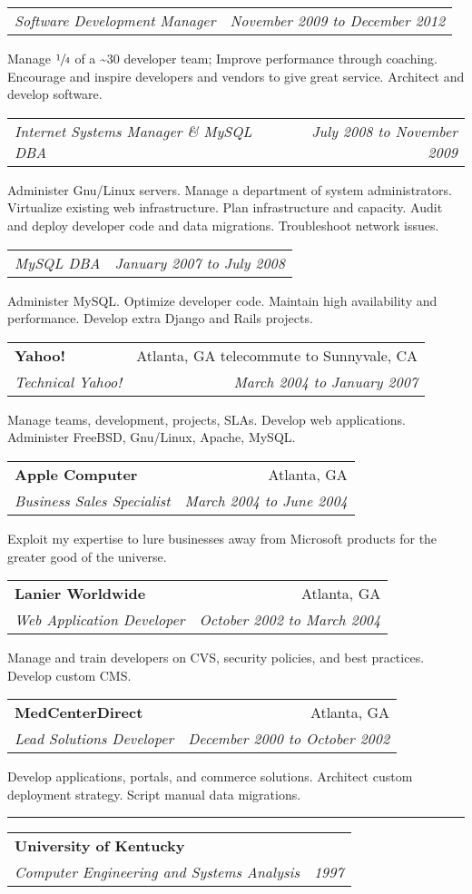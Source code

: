 \documentclass[10pt]{article}
\makeatletter
\newcounter{blocktitlechildren}
\newcommand{\blocktitle}[1]{
    \blocktitlechild{4mm}
    \setcounter{blocktitlechildren}{0}
    {{\sc{#1}\vspace{1.5mm}\hrule}\vspace*{1.5mm}}
}
\newcommand{\blocktitlechild}[2][]{
    \ifthenelse{\equal{\value{blocktitlechildren}}{0}}{}{\vspace{#2}#1}
    \addtocounter{blocktitlechildren}{1}
}
\newcommand{\sectionheader}[4]{
    \blocktitlechild{2mm}
    \begin{tabular*}{\textwidth}{l@{\extracolsep{\fill}}r}
    \textbf{#1} & #2\\
    \emph{#3} & \emph{#4}
    \end{tabular*}
}
\newcommand{\sectionsub}[2]{
    \blocktitlechild{1.4mm}
    \begin{tabular*}{\textwidth}{l@{\extracolsep{\fill}}r}
    \emph{#1} & \emph{#2}
    \end{tabular*}
}
\newenvironment{longtext}[1]{\small {#1}}
\makeatother
\begin{document}
\sectionsub
{Software Development Manager}
{November 2009 to December 2012}
\begin{longtext}
Manage $\sfrac{1}{4}$ of a \~{}30 developer team;
Improve performance through coaching.
Encourage and inspire developers and vendors to give great service.
Architect and develop software.
\end{longtext}
\sectionsub
{Internet Systems Manager \& MySQL DBA}
{July 2008 to November 2009}
\begin{longtext}
Administer Gnu/Linux servers.
Manage a department of system administrators.
Virtualize existing web infrastructure.
Plan infrastructure and capacity.
Audit and deploy developer code and data migrations.
Troubleshoot network issues.
\end{longtext}
\sectionsub
{MySQL DBA}
{January 2007 to July 2008}
\begin{longtext}
Administer MySQL.
Optimize developer code.
Maintain high availability and performance.
Develop extra Django and Rails projects.
\end{longtext}

\sectionheader
{Yahoo!}{Atlanta, GA telecommute to Sunnyvale, CA}
{Technical Yahoo!}
{March 2004 to January 2007}
\begin{longtext}
Manage teams, development, projects, SLAs.
Develop web applications.
Administer FreeBSD, Gnu/Linux, Apache, MySQL.
\end{longtext}

\sectionheader
{Apple Computer}{Atlanta, GA}
{Business Sales Specialist}
{March 2004 to June 2004}
\begin{longtext}
Exploit my expertise to lure businesses away from Microsoft products for the greater good of the universe.
\end{longtext}

\sectionheader
{Lanier Worldwide}{Atlanta, GA}
{Web Application Developer}
{October 2002 to March 2004}
\begin{longtext}
Manage and train developers on CVS, security policies, and best practices.
Develop custom CMS.
\end{longtext}

\sectionheader
{MedCenterDirect}{Atlanta, GA}
{Lead Solutions Developer}
{December 2000 to October 2002}
\begin{longtext}
Develop applications, portals, and commerce solutions.
Architect custom deployment strategy.
Script manual data migrations.
\end{longtext}

\blocktitle{Education}
\sectionheader
{University of Kentucky}{}
{Computer Engineering and Systems Analysis}
{1997}
\end{document}
